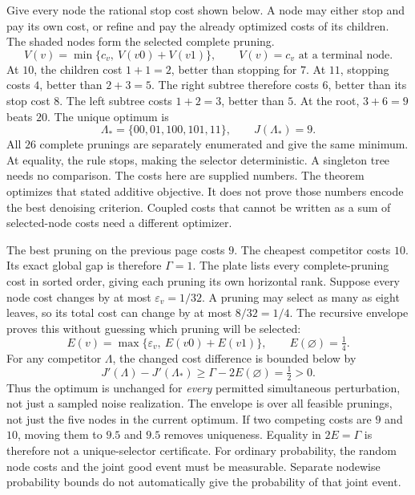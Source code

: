Give every node the rational stop cost shown below. A node may either stop and pay its own cost, or refine and pay the already optimized costs of its children. The shaded nodes form the selected complete pruning.
\[
V(v)=\min\{c_v,\ V(v0)+V(v1)\},
\qquad V(v)=c_v\text{ at a terminal node}.
\]
At $10$, the children cost $1+1=2$, better than stopping for $7$. At $11$, stopping costs $4$, better than $2+3=5$. The right subtree therefore costs $6$, better than its stop cost $8$. The left subtree costs $1+2=3$, better than $5$. At the root, $3+6=9$ beats $20$.
The unique optimum is
\[
\Lambda_* = \{00,01,100,101,11\},\qquad J(\Lambda_*)=9.
\]
All $26$ complete prunings are separately enumerated and give the same minimum. At equality, the rule stops, making the selector deterministic. A singleton tree needs no comparison.
The costs here are supplied numbers. The theorem optimizes that stated additive objective. It does not prove those numbers encode the best denoising criterion. Coupled costs that cannot be written as a sum of selected-node costs need a different optimizer.

The best pruning on the previous page costs $9$. The cheapest competitor costs $10$. Its exact global gap is therefore $\Gamma=1$. The plate lists every complete-pruning cost in sorted order, giving each pruning its own horizontal rank.
Suppose every node cost changes by at most $\varepsilon_v=1/32$. A pruning may select as many as eight leaves, so its total cost can change by at most $8/32=1/4$. The recursive envelope proves this without guessing which pruning will be selected:
\[
E(v)=\max\{\varepsilon_v,\ E(v0)+E(v1)\},\qquad E(\varnothing)=\tfrac14.
\]
For any competitor $\Lambda$, the changed cost difference is bounded below by
\[
J'(\Lambda)-J'(\Lambda_*)\ge \Gamma-2E(\varnothing)=\tfrac12>0.
\]
Thus the optimum is unchanged for \emph{every} permitted simultaneous perturbation, not just a sampled noise realization. The envelope is over all feasible prunings, not just the five nodes in the current optimum.
If two competing costs are $9$ and $10$, moving them to $9.5$ and $9.5$ removes uniqueness. Equality in $2E=\Gamma$ is therefore not a unique-selector certificate. For ordinary probability, the random node costs and the joint good event must be measurable. Separate nodewise probability bounds do not automatically give the probability of that joint event.

